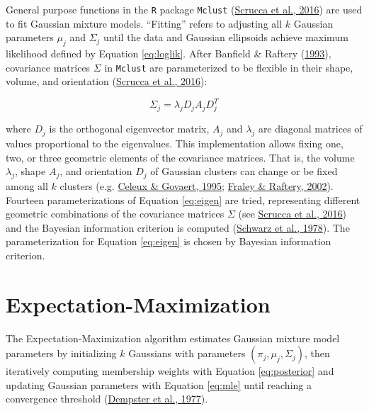 General purpose functions in the \texttt{R} package \texttt{Mclust} (\protect\hyperlink{ref-scrucca2016}{Scrucca et al., 2016}) are used to fit Gaussian mixture models. ``Fitting'' refers to adjusting all \(k\) Gaussian parameters \(\mu_j\) and \(\Sigma_j\) until the data and Gaussian ellipsoids achieve maximum likelihood defined by Equation \eqref{eq:loglik}. After Banfield \& Raftery (\protect\hyperlink{ref-banfield1993}{1993}), covariance matrices \(\Sigma\) in \texttt{Mclust} are parameterized to be flexible in their shape, volume, and orientation (\protect\hyperlink{ref-scrucca2016}{Scrucca et al., 2016}):

\begin{equation}
  \Sigma_j = \lambda_j D_j A_j D_j^T
  \label{eq:eigen}
\end{equation}

where \(D_j\) is the orthogonal eigenvector matrix, \(A_j\) and \(\lambda_j\) are diagonal matrices of values proportional to the eigenvalues. This implementation allows fixing one, two, or three geometric elements of the covariance matrices. That is, the volume \(\lambda_j\), shape \(A_j\), and orientation \(D_j\) of Gaussian clusters can change or be fixed among all \(k\) clusters (e.g. \protect\hyperlink{ref-celeux1995}{Celeux \& Govaert, 1995}; \protect\hyperlink{ref-fraley2002}{Fraley \& Raftery, 2002}). Fourteen parameterizations of Equation \eqref{eq:eigen} are tried, representing different geometric combinations of the covariance matrices \(\Sigma\) (see \protect\hyperlink{ref-scrucca2016}{Scrucca et al., 2016}) and the Bayesian information criterion is computed (\protect\hyperlink{ref-schwarz1978}{Schwarz et al., 1978}). The parameterization for Equation \eqref{eq:eigen} is chosen by Bayesian information criterion.

\hypertarget{expectation-maximization}{%
\section{Expectation-Maximization}\label{expectation-maximization}}

The Expectation-Maximization algorithm estimates Gaussian mixture model parameters by initializing \(k\) Gaussians with parameters \((\pi_j, \mu_j, \Sigma_j)\), then iteratively computing membership weights with Equation \eqref{eq:posterior} and updating Gaussian parameters with Equation \eqref{eq:mle} until reaching a convergence threshold (\protect\hyperlink{ref-dempster1977}{Dempster et al., 1977}).

